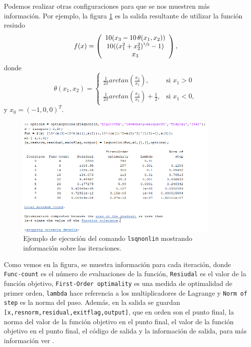 \documentclass[11pt,a4paper]{book}
\theoremstyle{definition}
\theoremstyle{remark}
\def\code#1{\texttt{#1}}
\begin{document}
Podemos realizar otras configuraciones para que se nos muestren más información. Por ejemplo, la figura \ref{fig:lsqnonlin-iter} es la salida resultante de utilizar la función resiudo
\begin{equation}
f(x)=\left(
\begin{array}{c}
	10(x_3-10\,\theta(x_1,x_2)) \\
	10((x_1^2+x_2^2)^{\sfrac{1}{2}}-1) \\
	x_3
\end{array}
\right),
\end{equation}
donde
\begin{equation}\label{eq:theta}
\theta(x_1,x_2)=\begin{cases}
	\frac{1}{2\pi}arctan\left(\frac{x_2}{x_1}\right), & \text{si } x_1 > 0 \\
	\frac{1}{2\pi}arctan\left(\frac{x_2}{x_1}\right)+\frac{1}{2}, & \text{si } x_1 < 0,
\end{cases}
\end{equation}
y $x_0 = (-1,0,0)^T$.

\begin{figure}[ht]
	\centering
	\includegraphics[width=0.9\textwidth]{imgs/lsqiter.png}
	\caption{Ejemplo de ejecución del comando \code{lsqnonlin} mostrando información sobre las iteraciones.}
	\label{fig:lsqnonlin-iter}
\end{figure}

Como vemos en la figura, se muestra información para cada iteración, donde \code{Func-count} es el número de evaluaciones de la función, \code{Resiudal} es el valor de la función objetivo, \code{First-Order optimality} es una medida de optimalidad de primer orden, \code{lambda} hace referencia a los multiplicadores de Lagrange y \code{Norm of step} es la norma del paso. Además, en la salida se guardan \code{[x,resnorm,residual,exitflag,output]}, que en orden son el punto final, la norma del valor de la función objetivo en el punto final, el valor de la función objetivo en el punto final, el código de salida y la información de salida, para más información ver \cite{lsqnonlin}.
\end{document}
